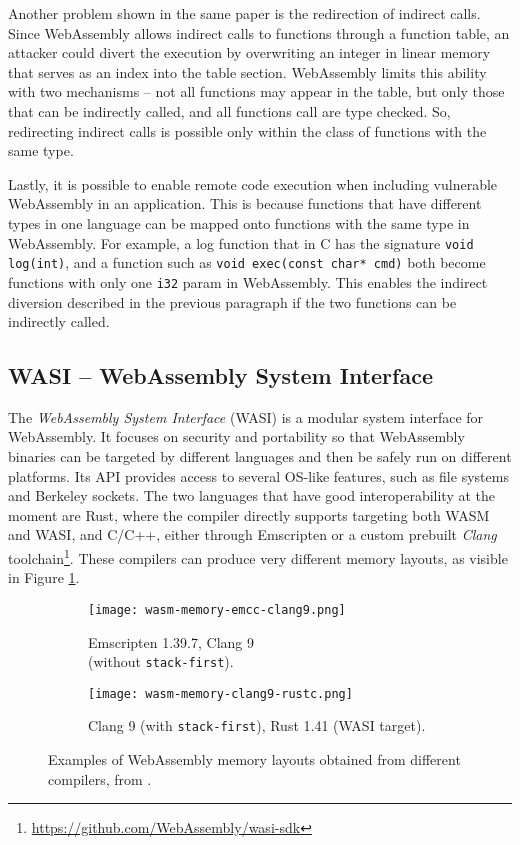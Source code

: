 Another problem shown in the same paper is the redirection of indirect calls. Since WebAssembly allows indirect calls
to functions through a function table, an attacker could divert the execution by overwriting an integer in linear memory
that serves as an index into the table section. WebAssembly limits this ability with two mechanisms -- not all functions
may appear in the table, but only those that can be indirectly called, and all functions call are type checked.
So, redirecting indirect calls is possible only within the class of functions with the same type.

Lastly, it is possible to enable remote code execution when including vulnerable WebAssembly in an application.
This is because functions that have different types in one language can be mapped onto functions with the same type
in WebAssembly. For example, a log function that in C has the signature \texttt{void log(int)}, and a function such as
\texttt{void exec(const char* cmd)} both become functions with only one \texttt{i32} param in WebAssembly.
This enables the indirect diversion described in the previous paragraph if the two functions can be indirectly called.

\subsection{WASI -- WebAssembly System Interface}
\label{sec:introduction-wasi}

The \textit{WebAssembly System Interface} (WASI) \cite{wasi} is a modular system interface for WebAssembly.
It focuses on security and portability so that WebAssembly binaries can be targeted by different languages
and then be safely run on different platforms.
Its API provides access to several OS-like features, such as file systems and Berkeley sockets.
The two languages that have good interoperability at the moment are Rust, where the compiler directly supports targeting both WASM and WASI,
and C/C++, either through Emscripten or a custom prebuilt \textit{Clang} toolchain\footnote{\url{https://github.com/WebAssembly/wasi-sdk}}.
These compilers can produce very different memory layouts, as visible in Figure \ref{fig:different-wasm-memory-layouts}.

\begin{figure}[ht]
  \centering
  \begin{subfigure}[b]{0.4\textwidth}
    \centering
    \texttt{[image: wasm-memory-emcc-clang9.png]}
    \caption{Emscripten 1.39.7, Clang 9\\(without \texttt{stack-first}).}
  \end{subfigure}
  \begin{subfigure}[b]{0.4\textwidth}
    \centering
    \texttt{[image: wasm-memory-clang9-rustc.png]}
    \caption{Clang 9 (with \texttt{stack-first}), Rust 1.41 (WASI target).}
  \end{subfigure}
  \caption{Examples of WebAssembly memory layouts obtained from different compilers, from \cite{binary-security-wasm-2020}.}
  \label{fig:different-wasm-memory-layouts}
\end{figure}

